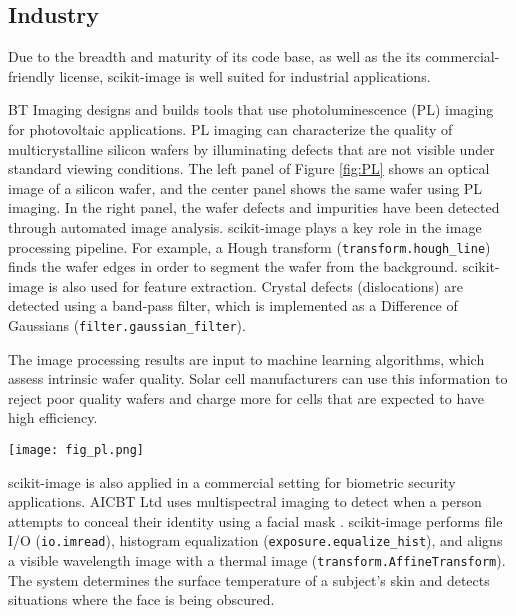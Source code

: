 
  \subsection*{Industry}
    \label{industry}

    Due to the breadth and maturity of its code base, as well as the its commercial-friendly license, scikit-image is well suited for industrial applications.

    BT Imaging \citep{BTImaging} designs and builds tools that use photoluminescence (PL) imaging for photovoltaic applications. PL imaging can characterize the quality of multicrystalline silicon wafers by illuminating defects that are not visible under standard viewing conditions. The left panel of Figure \ref{fig:PL} shows an optical image of a silicon wafer, and the center panel shows the same wafer using PL imaging. In the right panel, the wafer defects and impurities have been detected through automated image analysis. scikit-image plays a key role in the image processing pipeline. For example, a Hough transform (\texttt{transform.hough\_line}) finds the wafer edges in order to segment the wafer from the background. scikit-image is also used for feature extraction. Crystal defects (dislocations) are detected using a band-pass filter, which is implemented as a Difference of Gaussians (\texttt{filter.gaussian\_filter}).

    The image processing results are input to machine learning algorithms, which assess intrinsic wafer quality. Solar cell manufacturers can use this information to reject poor quality wafers and charge more for cells that are expected to have high efficiency.

    \begin{figure*}[bht]

      \texttt{[image: fig\_pl.png]}

      \caption{\textit{Left}: An image of an as-cut silicon wafer before it has been processed into a solar cell. \textit{Center}: A PL image of the same wafer. Wafer defects, which have a negative impact solar cell efficiency, are visible as dark regions. \textit{Right}: Image processing results. Defects in the crystal growth (dislocations) are colored blue, while red indicates the presence of impurities. \label{fig:PL}}
    \end{figure*}

    scikit-image is also applied in a commercial setting for biometric security applications. AICBT Ltd uses multispectral imaging to detect when a person attempts to conceal their identity using a facial mask \citep{AICBT}. scikit-image performs file I/O (\texttt{io.imread}), histogram equalization (\texttt{exposure.equalize\_hist}), and aligns a visible wavelength image with a thermal image (\texttt{transform.AffineTransform}). The system determines the surface temperature of a subject's skin and detects situations where the face is being obscured.

